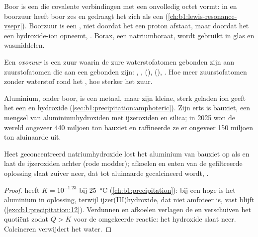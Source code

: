 Boor is een  die covalente verbindingen met een onvolledig
octet vormt: in  en boorzuur  heeft boor zes
 en gedraagt het zich als een 
(\cref{ch:b1:lewis-resonance-vsepr}). Boorzuur is een , niet
doordat het een proton afstaat, maar doordat het een hydroxide-ion
opneemt, . Borax, een natriumboraat,
wordt gebruikt in glas en wasmiddelen.

\begin{definition}[Oxozuur]\label{def:b1:p-block-13-15:oxoacid}
Een \emph{oxozuur} is een zuur waarin de zure
waterstofatomen gebonden zijn aan zuurstofatomen die aan een  gebonden zijn: , ,  (),
 (), . Hoe meer zuurstofatomen zonder
waterstof rond het , hoe sterker het zuur.
\end{definition}

Aluminium, onder boor, is een metaal, maar zijn kleine, sterk geladen ion
geeft het een  en hydroxide (\cref{sec:b1:precipitation:amphoteric}).
Zijn erts is bauxiet, een mengsel van aluminiumhydroxiden met ijzeroxiden
en silica; in 2025 won de wereld ongeveer 440 miljoen ton bauxiet en
raffineerde ze er ongeveer 150 miljoen ton aluinaarde uit.

\begin{proposition}\label{prop:b1:p-block-13-15:bayer}
Heet geconcentreerd natriumhydroxide lost het aluminium van bauxiet op
als  en laat de ijzeroxiden achter (rode modder); afkoelen en
enten van de gefiltreerde oplossing slaat zuiver  neer, dat
tot aluinaarde gecalcineerd wordt, .
\end{proposition}

\begin{proof}
 heeft $K = 10^{-1.23}$ bij
\qty{25}{\celsius} (\cref{ch:b1:precipitation}): bij een hoge \ce{[OH-]}
is het aluminium in oplossing, terwijl ijzer(III)hydroxide, dat niet
amfoteer is, vast blijft (\cref{exo:b1:precipitation:12}). Verdunnen en
afkoelen verlagen de \ce{[OH-]} en verschuiven het quotiënt zodat
$Q > K$ voor de omgekeerde reactie: het hydroxide slaat neer. Calcineren
verwijdert het water.
\end{proof}

